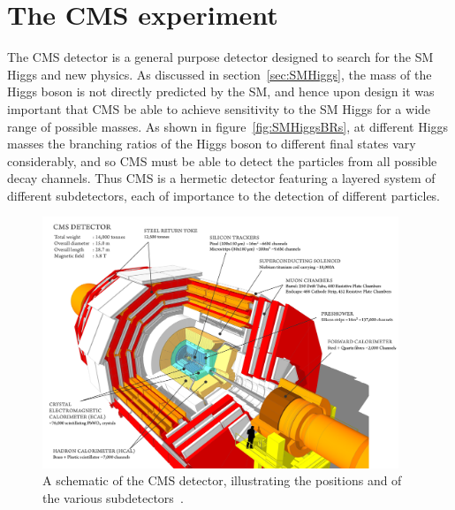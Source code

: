 \section{The CMS experiment}
\label{sec:CMSInDetail}

The CMS detector is a general purpose detector designed to search for the
\ac{SM} Higgs and new physics. As discussed in section~\ref{sec:SMHiggs}, the
mass of the Higgs boson is not directly predicted by the \ac{SM}, and hence upon
design it was important that CMS be able to achieve sensitivity to the \ac{SM} Higgs for a
wide range of possible masses. As shown in figure~\ref{fig:SMHiggsBRs}, at different
Higgs masses the branching ratios of the Higgs boson to different final states
vary considerably, and so CMS must be able to detect the particles from all
possible decay channels. Thus CMS is a hermetic detector featuring
a layered system of different subdetectors, each of importance to the detection
of different particles. 

\begin{figure}[htbp]
   \includegraphics[width=0.95\textwidth]{plots/detector/CMS_Schematic.png}
\caption[A schematic of the CMS detector, illustrating the positions of the
various subdetectors.]
{A schematic of the CMS detector, illustrating the positions and of the
various subdetectors~\cite{1742-6596-513-2-022032}.}
\label{fig:CMSschematic}
\end{figure}

